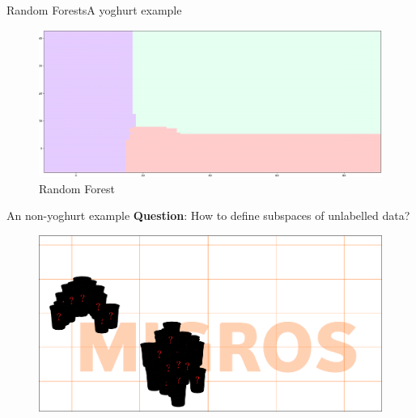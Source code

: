 \documentclass{beamer}
\begin{document}
\begin{frame}{Random Forests}{A yoghurt example}
	\begin{figure}
		\centering
		\includegraphics[width=\textwidth]{rf_nopoints}
		\caption{Random Forest}
	\end{figure}
\end{frame}

\begin{frame}{}{An non-yoghurt example}
	\textbf{Question}: How to define subspaces of unlabelled data?
	\begin{figure}
		\centering
		\includegraphics[width=\textwidth]{labelled-data-migros-new}
	\end{figure}
\end{frame}

\end{document}
